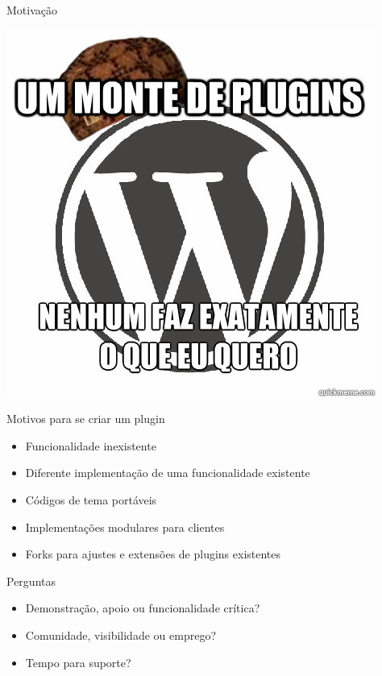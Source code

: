 \documentclass{beamer}
\begin{document}
\begin{frame}{Motivação}
\begin{center}
  \includegraphics[height=0.8\textheight]{./img/plugins.jpg}
\end{center}
\end{frame}

\begin{frame}{Motivos para se criar um plugin}
\begin{itemize}
  \pause \item Funcionalidade inexistente
  \pause \item Diferente implementação de uma funcionalidade existente
  \pause \item Códigos de tema portáveis
  \pause \item Implementações modulares para clientes
  \pause \item Forks para ajustes e extensões de plugins existentes
\end{itemize}
\end{frame}

\begin{frame}{Perguntas}
\begin{itemize}
  \pause \item Demonstração, apoio ou funcionalidade crítica?
  \pause \item Comunidade, visibilidade ou emprego?
  \pause \item Tempo para suporte?
\end{itemize}
\end{frame}
\end{document}
